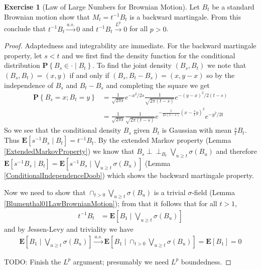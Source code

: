 \documentclass{amsbook}
\theoremstyle{definition}
\newtheorem{xca}{Exercise}
\theoremstyle{remark}
\newcommand{\Independent}{\perp \! \! \! \perp}
\newcommand{\cindependent}[3]{#1 \Independent_{#3} #2}
\newcommand{\expectation}[1]{\textbf{E}\left[#1\right]}
\newcommand{\cexpectationlong}[2]{\textbf{E}\left[ #2 \mid #1 \right]}
\newcommand{\probability}[1]{\textbf{P}\left \{#1 \right \}}
\newcommand{\cprobability}[2]{\textbf{P} \left \{#2 \mid #1 \right \}}
\newcommand{\toas}{\overset{a.s.}\to}
\newcommand{\tolp}[1]{\overset{L^#1}\to}
\begin{document}
\begin{xca}[Law of Large Numbers for Brownian Motion]Let $B_t$ be a standard Brownian motion show that $M_t =
  t^{-1}B_t$ is a backward martingale.  From this conclude that
  $t^{-1}B_t \toas 0$ and $t^{-1}B_t \tolp{p} 0$ for all $p > 0$.
\end{xca}
\begin{proof}
Adaptedness and integrability are immediate.  For the backward
martingale property, let $s < t$ and we first find the density function for the
conditional distribution $\cprobability{B_t}{B_s \in \cdot}$.  To find
the joint density $(B_s, B_t)$ we note that $(B_s,B_t) = (x,y)$ if and
only if $(B_s,B_t - B_s) = (x, y - x)$ so by the independence of $B_s$
and $B_t - B_s$ and completing the square we get
\begin{align*}
\probability{B_s = x ; B_t = y} &= \frac{1}{\sqrt{2\pi s} } e^{-x^2/2s}
  \frac{1}{\sqrt{2\pi(t- s)}} e^{-(y-x)^2/2(t-s)} \\
&= \frac{1}{\sqrt{2\pi s}} \frac{1}{\sqrt{2\pi(t- s)}}
    e^{-\frac{t}{2s(t-s)}(x - \frac{s}{t}y)^2} e^{-y^2/2t}
\end{align*}
So we see that the conditional density $B_s$ given $B_t$ is Gaussian
with mean $\frac{s}{t} B_t$.  Thus $\cexpectationlong{B_t}{s^{-1} B_s}
= t^{-1} B_t$.  By the extended Markov property (Lemma
\ref{ExtendedMarkovProperty}) we know that $\cindependent{B_s}{\bigvee_{u \geq t}\sigma(
    B_u)}{B_t}$ and therefore $\cexpectationlong{B_t}{s^{-1} B_s} = \cexpectationlong{\bigvee_{u \geq t}\sigma(
    B_u)}{s^{-1} B_s}$ (Lemma \ref{ConditionalIndependenceDoob}) which
  shows the backward martingale property.

Now we need to show that $\cap_{t > 0} \bigvee_{u \geq t} \sigma(B_u)$
is a trivial $\sigma$-field (Lemma \ref{Blumenthal01LawBrownianMotion});
from that it follows that for all $t > 1$, 
\begin{align*}
t^{-1} B_t &= \cexpectationlong{\bigvee_{u \geq t} \sigma(B_u)}{B_1} 
\end{align*}
and by Jessen-Levy and triviality we have 
\begin{align*}
\cexpectationlong{\bigvee_{u \geq t}
  \sigma(B_u)}{B_1} \toas \cexpectationlong{\cap_{t>0} \bigvee_{u \geq t}
  \sigma(B_u)}{B_1} = \expectation{B_1} = 0
\end{align*}

TODO: Finish the $L^p$ argument; presumably we need $L^p$ boundedness.
\end{proof}
\end{document}
